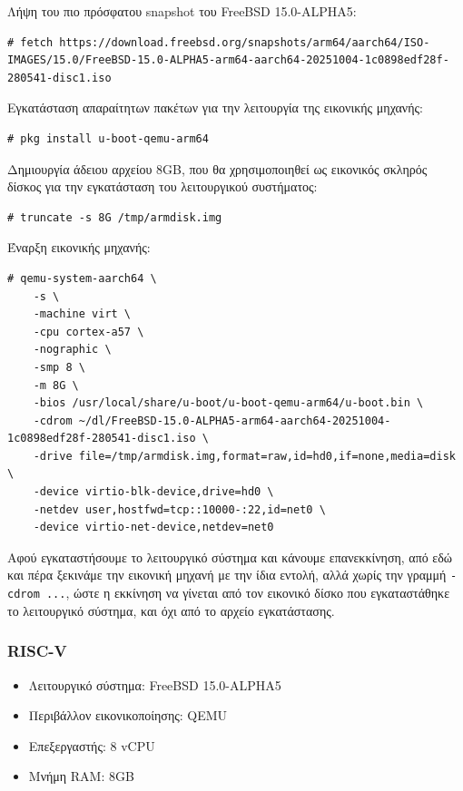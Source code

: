 \documentclass[12pt]{article}
\begin{document}
Λήψη του πιο πρόσφατου snapshot του FreeBSD 15.0-ALPHA5:

\begin{lstlisting}
# fetch https://download.freebsd.org/snapshots/arm64/aarch64/ISO-IMAGES/15.0/FreeBSD-15.0-ALPHA5-arm64-aarch64-20251004-1c0898edf28f-280541-disc1.iso
\end{lstlisting}

Εγκατάσταση απαραίτητων πακέτων για την λειτουργία της εικονικής μηχανής:

\begin{lstlisting}
# pkg install u-boot-qemu-arm64
\end{lstlisting}

Δημιουργία άδειου αρχείου 8GB, που θα χρησιμοποιηθεί ως εικονικός σκληρός
δίσκος για την εγκατάσταση του λειτουργικού συστήματος:

\begin{lstlisting}
# truncate -s 8G /tmp/armdisk.img
\end{lstlisting}

Έναρξη εικονικής μηχανής:

\begin{lstlisting}
# qemu-system-aarch64 \
	-s \
	-machine virt \
	-cpu cortex-a57 \
	-nographic \
	-smp 8 \
	-m 8G \
	-bios /usr/local/share/u-boot/u-boot-qemu-arm64/u-boot.bin \
	-cdrom ~/dl/FreeBSD-15.0-ALPHA5-arm64-aarch64-20251004-1c0898edf28f-280541-disc1.iso \
	-drive file=/tmp/armdisk.img,format=raw,id=hd0,if=none,media=disk \
	-device virtio-blk-device,drive=hd0 \
	-netdev user,hostfwd=tcp::10000-:22,id=net0 \
	-device virtio-net-device,netdev=net0
\end{lstlisting}

Αφού εγκαταστήσουμε το λειτουργικό σύστημα και κάνουμε επανεκκίνηση, από εδώ
και πέρα ξεκινάμε την εικονική μηχανή με την ίδια εντολή, αλλά χωρίς την γραμμή
\lstinline{-cdrom ...}, ώστε η εκκίνηση να γίνεται από τον εικονικό δίσκο που
εγκαταστάθηκε το λειτουργικό σύστημα, και όχι από το αρχείο εγκατάστασης.

\subsubsection{RISC-V}

\begin{itemize}
	\item Λειτουργικό σύστημα: FreeBSD 15.0-ALPHA5
	\item Περιβάλλον εικονικοποίησης: QEMU
	\item Επεξεργαστής: 8 vCPU
	\item Μνήμη RAM: 8GB
\end{itemize}
\end{document}
